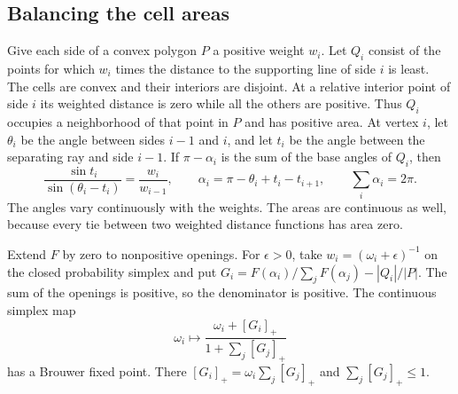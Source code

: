 \documentclass[11pt,a4paper,reqno]{amsart}
\theoremstyle{remark}
\numberwithin{equation}{section}
\begin{document}
\subsection{Balancing the cell areas}\label{sec:balance}

Give each side of a convex polygon $P$ a positive weight $w_i$. Let $Q_i$
consist of the points for which $w_i$ times the distance to the supporting
line of side $i$ is least. The cells are convex and their interiors are disjoint. At a relative interior
point of side $i$ its weighted distance is zero while all the others are
positive. Thus $Q_i$ occupies a neighborhood of that point in $P$ and has
positive area. At vertex $i$, let $\theta_i$ be the angle
between sides $i-1$ and $i$, and let $t_i$ be the angle between the separating
ray and side $i-1$. If $\pi-\alpha_i$ is the sum of the base angles of $Q_i$,
then
\[
 \frac{\sin t_i}{\sin(\theta_i-t_i)}=\frac{w_i}{w_{i-1}},
 \qquad \alpha_i=\pi-\theta_i+t_i-t_{i+1},\qquad \sum_i\alpha_i=2\pi .
\]
The angles vary continuously with the weights. The areas are continuous as
well, because every tie between two weighted distance functions has area zero.

Extend $F$ by zero to nonpositive openings. For $\epsilon>0$, take
$w_i=(\omega_i+\epsilon)^{-1}$ on the closed probability simplex and put
$G_i=F(\alpha_i)/\sum_j F(\alpha_j)-|Q_i|/|P|$. The sum of the openings is
positive, so the denominator is positive. The continuous simplex map
\[
 \omega_i\longmapsto\frac{\omega_i+[G_i]_+}{1+\sum_j[G_j]_+}
\]
has a Brouwer fixed point. There $[G_i]_+=\omega_i\sum_j[G_j]_+$ and
$\sum_j[G_j]_+\le1$.
\end{document}
